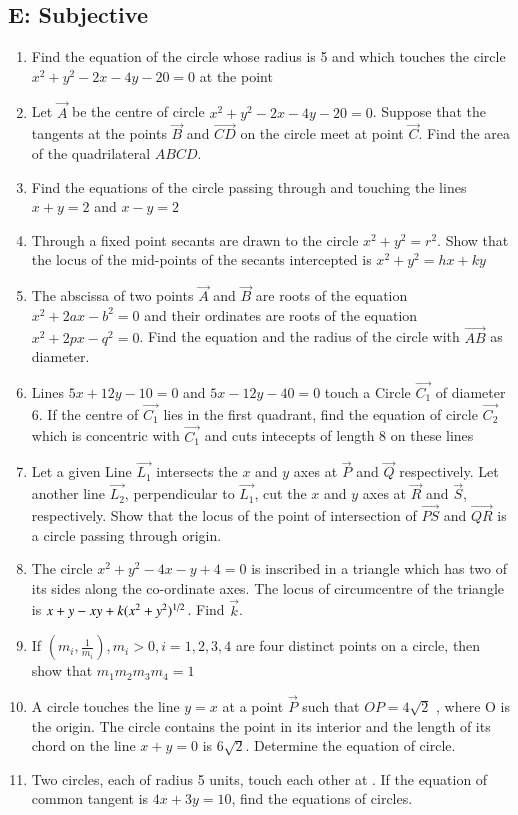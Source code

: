 \documentclass[journal,12pt,twocolumn]{IEEEtran}
\theoremstyle{remark}
\begin{document}
\subsection*{E: Subjective}
\begin{enumerate}
\item Find the equation of the circle whose radius is 5 and which touches the circle $x^2+y^2-2x-4y-20=0$ at the point 
\hfill{}
\item Let $\vec{A}$ be the centre of circle $x^2+y^2-2x-4y-20=0$. Suppose that the tangents at the points $\vec{B}$ and $\vec{CD}$  on the circle meet at point $\vec{C}$. Find the area of the quadrilateral $ABCD$.
\hfill{}
\item Find the equations of the circle passing through  and touching the lines $x+y=2$ and $x-y=2$
\hfill{}
\item Through a fixed point  secants are drawn to the circle $x^2+y^2=r^2$. Show that the locus of the mid-points of the secants intercepted is $x^2+y^2=hx+ky$
\hfill{}
\item The abscissa of two points $\vec{A}$ and $\vec{B}$ are roots of the equation $x^2+2ax-b^2=0$ and their ordinates are roots of the equation $x^2+2px-q^2=0$. Find the equation and the radius of the circle with $\vec{AB}$ as diameter.
\hfill{}
\item Lines $5x+12y-10=0$ and $5x-12y-40=0$ touch a Circle $\vec{C_1}$ of diameter 6. If the centre of $\vec{C_1}$ lies in the first quadrant, find the equation of circle $\vec{C_2}$ which is concentric with $\vec{C_1}$ and cuts intecepts of length 8 on these lines
\hfill{}
\item Let a given Line $\vec{L_1}$ intersects the $x$ and $y$ axes at $\vec{P}$ and $\vec{Q}$ respectively. Let another line $\vec{L_2}$, perpendicular to $\vec{L_1}$, cut the $x$ and $y$ axes at $\vec{R}$ and $\vec{S}$, respectively. Show that the locus of the point of intersection of $\vec{PS}$ and $\vec{QR}$ is a circle passing through origin.
\hfill{}
\item The circle $x^2+y^2-4x-y+4=0$ is inscribed in a triangle which has two of its sides along the co-ordinate axes. The locus of circumcentre of the triangle is $x+y-xy+k(x^2+y^2)\textsuperscript{1/2}$. Find $\vec{k}$.
\hfill{}
\item If $\left( m_i, \frac{1}{m_i} \right), m_i > 0, i = 1, 2, 3, 4$ are four distinct points on a circle, then show that $m_1m_2m_3m_4=1$
\hfill{}
\item A circle touches the line $y=x$ at a point $\vec{P}$ such that $OP=4\sqrt{2}$ , where O is the origin. The circle contains the point  in its interior and the length of its chord on the line $x+y=0$ is $6\sqrt{2}$. Determine the equation of circle.
\hfill{}
\item Two circles, each of radius 5 units, touch each other at . If the equation of common tangent is $4x+3y=10$, find the equations of circles.
\hfill{}
\end{enumerate}
\end{document}
